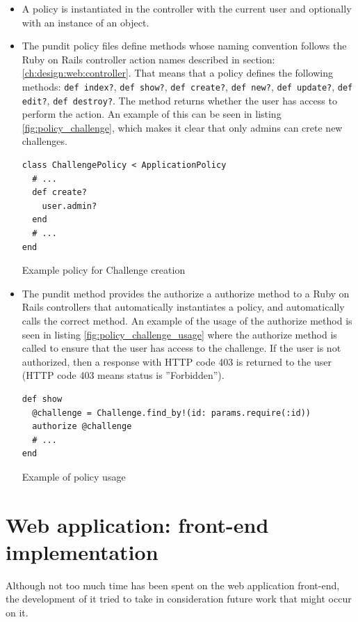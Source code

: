 \begin{itemize}
    \item A policy is instantiated in the controller with the current user and optionally with an instance of an object.
    \item The pundit policy files define methods whose naming convention follows the Ruby on Rails controller action names described in section: \ref{ch:design:web:controller}. That means that a policy defines the following methods: \texttt{def index?}, \texttt{def show?}, \texttt{def create?}, \texttt{def new?}, \texttt{def update?}, \texttt{def edit?}, \texttt{def destroy?}. The method returns whether the user has access to perform the action. An example of this can be seen in listing \ref{fig:policy_challenge}, which makes it clear that only admins can crete new challenges.

\begin{listing}
\begin{verbatim}
class ChallengePolicy < ApplicationPolicy
  # ...
  def create?
    user.admin?
  end
  # ...
end
\end{verbatim}
\caption{Example policy for Challenge creation}
\label{fig:policy_challenge}
\end{listing}
    \item The pundit method provides the authorize a authorize method to a Ruby on Rails controllers that automatically instantiates a policy, and automatically calls the correct method. An example of the usage of the authorize method is seen in listing \ref{fig:policy_challenge_usage} where the authorize method is called to ensure that the user has access to the challenge. If the user is not authorized, then a response with HTTP code 403 is returned to the user (HTTP code 403 means status is ''Forbidden'').
\begin{listing}[H]
\begin{verbatim}
def show
  @challenge = Challenge.find_by!(id: params.require(:id))
  authorize @challenge
  # ...
end
\end{verbatim}
\caption{Example of policy usage}
\label{fig:policy_challenge_usage}
\end{listing}
\end{itemize}

\section{Web application: front-end implementation}
Although not too much time has been spent on the web application front-end, the development of it tried to take in consideration future work that might occur on it. 

